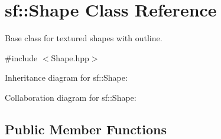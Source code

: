 \hypertarget{classsf_1_1_shape}{}\section{sf\+:\+:Shape Class Reference}
\label{classsf_1_1_shape}


Base class for textured shapes with outline.  




{\ttfamily \#include $<$Shape.\+hpp$>$}



Inheritance diagram for sf\+:\+:Shape\+:


Collaboration diagram for sf\+:\+:Shape\+:
\subsection*{Public Member Functions}

